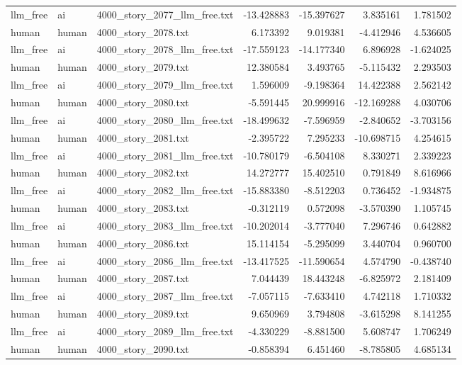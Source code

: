 \begin{longtable}{lllrrrr}
llm\_free & ai & 4000\_story\_2077\_llm\_free.txt & -13.428883 & -15.397627 & 3.835161 & 1.781502 \\
human & human & 4000\_story\_2078.txt & 6.173392 & 9.019381 & -4.412946 & 4.536605 \\
llm\_free & ai & 4000\_story\_2078\_llm\_free.txt & -17.559123 & -14.177340 & 6.896928 & -1.624025 \\
human & human & 4000\_story\_2079.txt & 12.380584 & 3.493765 & -5.115432 & 2.293503 \\
llm\_free & ai & 4000\_story\_2079\_llm\_free.txt & 1.596009 & -9.198364 & 14.422388 & 2.562142 \\
human & human & 4000\_story\_2080.txt & -5.591445 & 20.999916 & -12.169288 & 4.030706 \\
llm\_free & ai & 4000\_story\_2080\_llm\_free.txt & -18.499632 & -7.596959 & -2.840652 & -3.703156 \\
human & human & 4000\_story\_2081.txt & -2.395722 & 7.295233 & -10.698715 & 4.254615 \\
llm\_free & ai & 4000\_story\_2081\_llm\_free.txt & -10.780179 & -6.504108 & 8.330271 & 2.339223 \\
human & human & 4000\_story\_2082.txt & 14.272777 & 15.402510 & 0.791849 & 8.616966 \\
llm\_free & ai & 4000\_story\_2082\_llm\_free.txt & -15.883380 & -8.512203 & 0.736452 & -1.934875 \\
human & human & 4000\_story\_2083.txt & -0.312119 & 0.572098 & -3.570390 & 1.105745 \\
llm\_free & ai & 4000\_story\_2083\_llm\_free.txt & -10.202014 & -3.777040 & 7.296746 & 0.642882 \\
human & human & 4000\_story\_2086.txt & 15.114154 & -5.295099 & 3.440704 & 0.960700 \\
llm\_free & ai & 4000\_story\_2086\_llm\_free.txt & -13.417525 & -11.590654 & 4.574790 & -0.438740 \\
human & human & 4000\_story\_2087.txt & 7.044439 & 18.443248 & -6.825972 & 2.181409 \\
llm\_free & ai & 4000\_story\_2087\_llm\_free.txt & -7.057115 & -7.633410 & 4.742118 & 1.710332 \\
human & human & 4000\_story\_2089.txt & 9.650969 & 3.794808 & -3.615298 & 8.141255 \\
llm\_free & ai & 4000\_story\_2089\_llm\_free.txt & -4.330229 & -8.881500 & 5.608747 & 1.706249 \\
human & human & 4000\_story\_2090.txt & -0.858394 & 6.451460 & -8.785805 & 4.685134 \\

\end{longtable}
